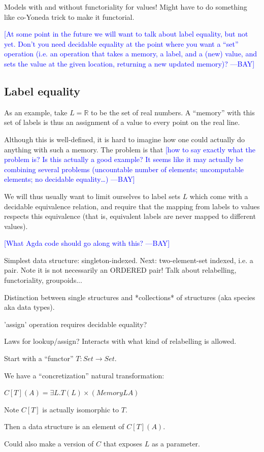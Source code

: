 \documentclass{jfp}
\newcommand{\authornote}[3]{\textcolor{#1}{[#3 ---#2]}}
\newcommand{\authornote}[3]{}
\newcommand{\bay}[1]{\authornote{blue}{BAY}{#1}}
\begin{document}
\begin{commentary}
  Models with and without functoriality for values!  Might have to do
  something like co-Yoneda trick to make it functorial.
\end{commentary}

\bay{At some point in the future we will want to talk about label
  equality, but not yet.  Don't you need decidable equality at the
  point where you want a ``set'' operation (i.e. an operation that
  takes a memory, a label, and a (new) value, and sets the value at
  the given location, returning a new updated memory)?}

\subsection{Label equality}
\label{sec:label-equality}

As an example, take $L = \mathbb{R}$ to be the set of real numbers.
A ``memory'' with this set of labels is thus an assignment of a value
to every point on the real line.

Although this is well-defined, it is hard to imagine how one could
actually do anything with such a memory.  The problem is that
\bay{how to say exactly what the problem is?  Is this actually a good
  example?  It seems like it may actually be combining several
  problems (uncountable number of elements; uncomputable elements; no
  decidable equality\dots)}

We will thus usually want to limit ourselves to label sets $L$ which
come with a decidable equivalence relation, and require that the
mapping from labels to values respects this equivalence (that is,
equivalent labels are never mapped to different values).

\bay{What Agda code should go along with this?}


\begin{commentary}
  Simplest data structure: singleton-indexed.  Next: two-element-set
  indexed, i.e. a pair.  Note it is not necessarily an ORDERED pair!
  Talk about relabelling, functoriality, groupoids...

  Distinction between single structures and *collections* of
  structures (aka species aka data types).

  'assign' operation requires decidable equality?

  Laws for lookup/assign?  Interacts with what kind of relabelling is
  allowed.
\end{commentary}

\begin{commentary}
  Start with a ``functor'' $T : Set \to Set$.

  We have a ``concretization'' natural transformation:

  $C[T](A) = \exists L. T(L) \times (Memory L A)$

  Note $C[T]$ is actually isomorphic to $T$.

  Then a data structure is an element of $C[T](A)$.

  Could also make a version of $C$ that exposes $L$ as a parameter.
\end{commentary}
\end{document}
